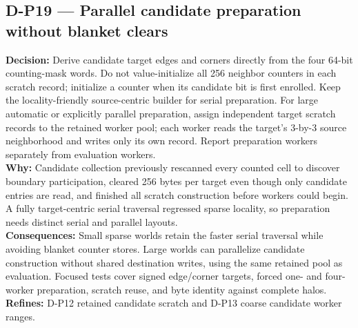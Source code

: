 \subsection*{D-P19 --- Parallel candidate preparation without blanket clears}
\begin{decisionbox}[title={D-P19 \quad 2026-08-09}]
\textbf{Decision:} Derive candidate target edges and corners directly from the
four 64-bit counting-mask words. Do not value-initialize all 256 neighbor
counters in each scratch record; initialize a counter when its candidate bit
is first enrolled. Keep the locality-friendly source-centric builder for
serial preparation. For large automatic or explicitly parallel preparation,
assign independent target scratch records to the retained worker pool; each
worker reads the target's 3-by-3 source neighborhood and writes only its own
record. Report preparation workers separately from evaluation workers.\\
\textbf{Why:} Candidate collection previously rescanned every counted cell to
discover boundary participation, cleared 256 bytes per target even though only
candidate entries are read, and finished all scratch construction before
workers could begin. A fully target-centric serial traversal regressed sparse
locality, so preparation needs distinct serial and parallel layouts.\\
\textbf{Consequences:} Small sparse worlds retain the faster serial traversal
while avoiding blanket counter stores. Large worlds can parallelize candidate
construction without shared destination writes, using the same retained pool
as evaluation. Focused tests cover signed edge/corner targets, forced one- and
four-worker preparation, scratch reuse, and byte identity against complete
halos.\\
\textbf{Refines:} D-P12 retained candidate scratch and D-P13 coarse candidate
worker ranges.
\end{decisionbox}

